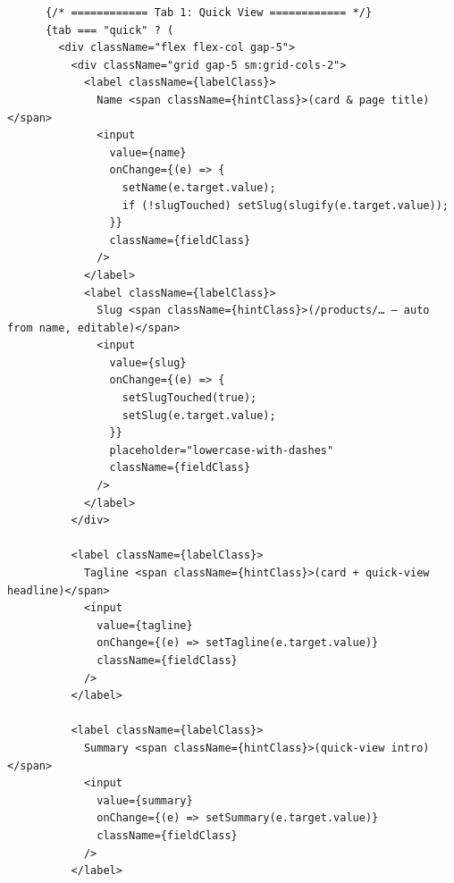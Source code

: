 \documentclass[11pt,a4paper]{article}
\begin{document}
\begin{lstlisting}
      {/* ============ Tab 1: Quick View ============ */}
      {tab === "quick" ? (
        <div className="flex flex-col gap-5">
          <div className="grid gap-5 sm:grid-cols-2">
            <label className={labelClass}>
              Name <span className={hintClass}>(card & page title)</span>
              <input
                value={name}
                onChange={(e) => {
                  setName(e.target.value);
                  if (!slugTouched) setSlug(slugify(e.target.value));
                }}
                className={fieldClass}
              />
            </label>
            <label className={labelClass}>
              Slug <span className={hintClass}>(/products/… — auto from name, editable)</span>
              <input
                value={slug}
                onChange={(e) => {
                  setSlugTouched(true);
                  setSlug(e.target.value);
                }}
                placeholder="lowercase-with-dashes"
                className={fieldClass}
              />
            </label>
          </div>

          <label className={labelClass}>
            Tagline <span className={hintClass}>(card + quick-view headline)</span>
            <input
              value={tagline}
              onChange={(e) => setTagline(e.target.value)}
              className={fieldClass}
            />
          </label>

          <label className={labelClass}>
            Summary <span className={hintClass}>(quick-view intro)</span>
            <input
              value={summary}
              onChange={(e) => setSummary(e.target.value)}
              className={fieldClass}
            />
          </label>


\end{lstlisting}
\end{document}
